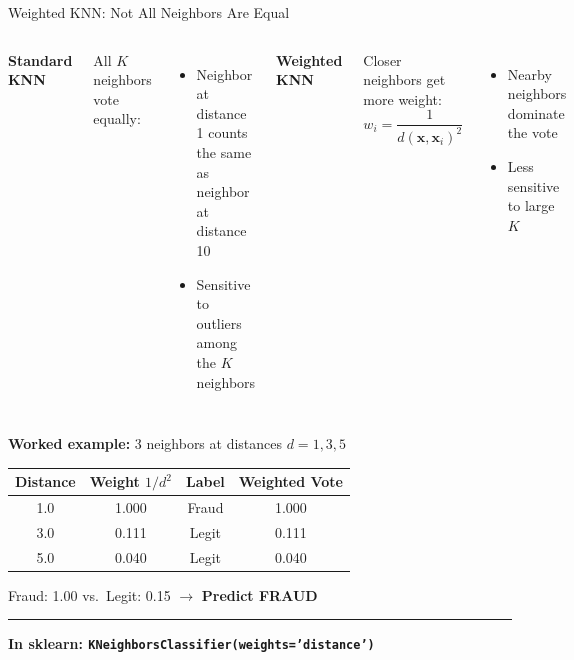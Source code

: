 \documentclass[8pt,aspectratio=169]{beamer}
\newcommand{\bottomnote}[1]{%
\vfill
\vspace{-2mm}
\textcolor{mllavender2}{\rule{\textwidth}{0.4pt}}
\vspace{1mm}
\footnotesize
\textbf{#1}
}
\newenvironment{compactlist}{%
  \begin{itemize}%
    \setlength{\itemsep}{2pt}%
    \setlength{\parskip}{0pt}%
    \setlength{\parsep}{0pt}%
}{%
  \end{itemize}%
}
\begin{document}
\begin{frame}[t]{Weighted KNN: Not All Neighbors Are Equal}
\begin{columns}[T]
\small
\textbf{Standard KNN}

\footnotesize
All $K$ neighbors vote equally:
\begin{compactlist}
\item \footnotesize Neighbor at distance 1 counts the same as neighbor at distance 10
\item \footnotesize Sensitive to outliers among the $K$ neighbors
\end{compactlist}

\small
\textbf{Weighted KNN}

\footnotesize
Closer neighbors get more weight:
\[w_i = \frac{1}{d(\mathbf{x}, \mathbf{x}_i)^2}\]
\begin{compactlist}
\item \footnotesize Nearby neighbors dominate the vote
\item \footnotesize Less sensitive to large $K$
\end{compactlist}
\end{columns}

\vspace{3mm}
\footnotesize
\textbf{Worked example:} 3 neighbors at distances $d{=}1, 3, 5$

\vspace{1mm}
\begin{tabular}{cccc}
\toprule
\textbf{Distance} & \textbf{Weight} $1/d^2$ & \textbf{Label} & \textbf{Weighted Vote} \\
\midrule
1.0 & 1.000 & Fraud & 1.000 \\
3.0 & 0.111 & Legit & 0.111 \\
5.0 & 0.040 & Legit & 0.040 \\
\bottomrule
\end{tabular}
\quad Fraud: 1.00 vs.\ Legit: 0.15 $\to$ \textcolor{mlred}{\textbf{Predict FRAUD}}
\bottomnote{In sklearn: \texttt{KNeighborsClassifier(weights='distance')}}
\end{frame}
\end{document}
